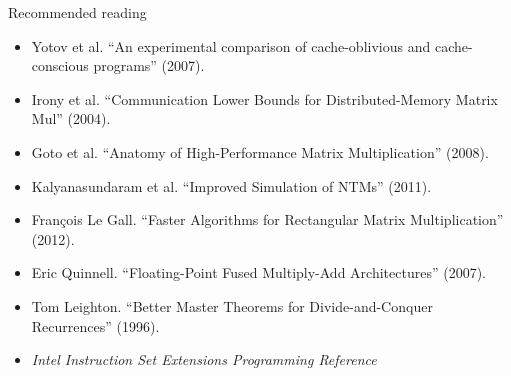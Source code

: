 \documentclass[mathserif,xcolor={dvipsnames,table}]{beamer}
\begin{document}
\begin{frame}{Recommended reading}
\tiny{
\begin{itemize}
\item Yotov et al. ``An experimental comparison of cache-oblivious and cache-conscious programs'' (2007).
\item Irony et al. ``Communication Lower Bounds for Distributed-Memory Matrix Mul'' (2004).
\item Goto et al. ``Anatomy of High-Performance Matrix Multiplication'' (2008).
\item Kalyanasundaram et al. ``Improved Simulation of NTMs'' (2011).
\item Fran\c{c}ois Le Gall. ``Faster Algorithms for Rectangular Matrix Multiplication'' (2012).
\item Eric Quinnell. ``Floating-Point Fused Multiply-Add Architectures'' (2007).
\item Tom Leighton. ``Better Master Theorems for Divide-and-Conquer Recurrences'' (1996).
\item \textit{Intel Instruction Set Extensions Programming Reference}
\end{itemize}
}
\end{frame}

\end{document}
